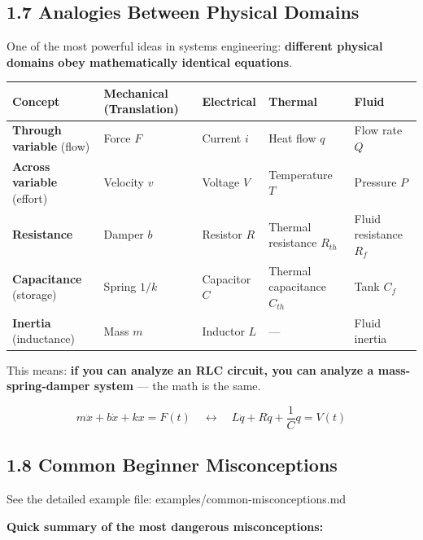 \documentclass[11pt,a4paper]{book}
\begin{document}
\medskip\noindent\hrulefill\medskip

\subsection{1.7 Analogies Between Physical Domains}

One of the most powerful ideas in systems engineering: \textbf{different physical domains obey mathematically identical equations}.

\begin{center}
\begin{tabular}{|l|l|l|l|l|}
\hline
Concept & Mechanical (Translation) & Electrical & Thermal & Fluid \\
\hline
\textbf{Through variable} (flow) & Force $F$ & Current $i$ & Heat flow $q$ & Flow rate $Q$ \\
\textbf{Across variable} (effort) & Velocity $v$ & Voltage $V$ & Temperature $T$ & Pressure $P$ \\
\textbf{Resistance} & Damper $b$ & Resistor $R$ & Thermal resistance $R_{th}$ & Fluid resistance $R_f$ \\
\textbf{Capacitance} (storage) & Spring $1/k$ & Capacitor $C$ & Thermal capacitance $C_{th}$ & Tank $C_f$ \\
\textbf{Inertia} (inductance) & Mass $m$ & Inductor $L$ & — & Fluid inertia \\
\hline
\end{tabular}
\end{center}

This means: \textbf{if you can analyze an RLC circuit, you can analyze a mass-spring-damper system} — the math is the same.

\[m\ddot{x} + b\dot{x} + kx = F(t) \quad \longleftrightarrow \quad L\ddot{q} + R\dot{q} + \frac{1}{C}q = V(t)\]

\medskip\noindent\hrulefill\medskip

\subsection{1.8 Common Beginner Misconceptions}

See the detailed example file: examples/common-misconceptions.md

\textbf{Quick summary of the most dangerous misconceptions:}
\end{document}
